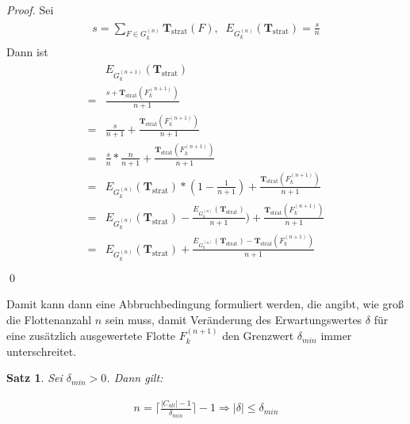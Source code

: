 \documentclass[a4paper,12pt]{llncs}
\numberwithin{equation}{section}
\newtheorem{satz}{Satz}
\DeclareMathOperator{\strat}{strat}
\begin{document}
\begin{proof}
Sei
\begin{align}
\begin{split}
s=\sum_{F \in G_k^{(n)}} \mathbf{T}_{\strat}(F),\;\; E_{G_k^{(n)}}(\mathbf{T}_{\strat}) =\frac{s}{n}
\end{split}
\end{align}
Dann ist
\begin{align}
\begin{split}
&E_{G_k^{(n+1)}}(\mathbf{T}_{\strat})\\
=&\frac{s+ \mathbf{T}_{\strat}(F_k^{(n+1)}) }{n + 1}\\
=&\frac{s}{n + 1} + \frac{\mathbf{T}_{\strat}(F_k^{(n+1)}) }{n + 1}\\
=&\frac{s}{n} * \frac{n}{n + 1} + \frac{\mathbf{T}_{\strat}(F_k^{(n+1)}) }{n + 1}\\
=&E_{G_k^{(n)}}(\mathbf{T}_{\strat}) * (1 - \frac{1}{n + 1}) + \frac{\mathbf{T}_{\strat}(F_k^{(n+1)}) }{n + 1}\\
=&E_{G_k^{(n)}}(\mathbf{T}_{\strat}) - \frac{E_{G_k^{(n)}}(\mathbf{T}_{\strat})}{n + 1}) + \frac{\mathbf{T}_{\strat}(F_k^{(n+1)}) }{n + 1}\\
=&E_{G_k^{(n)}}(\mathbf{T}_{\strat}) + \frac{E_{G_k^{(n)}}(\mathbf{T}_{\strat}) - \mathbf{T}_{\strat}(F_k^{(n+1)}) }{n + 1}\\
\end{split}
\end{align}
\qed
\end{proof}

Damit kann dann eine Abbruchbedingung formuliert werden, die angibt, wie groß die Flottenanzahl $n$ sein muss, damit Veränderung des Erwartungswertes $\delta$ für eine zusätzlich ausgewertete Flotte $F_k^{(n+1)}$ den Grenzwert $\delta_{min}$ immer unterschreitet.



\begin{satz}
Sei $\delta_{min} > 0$.
Dann gilt:

\begin{align}
n = \lceil \frac{|C_{all}| - 1}{\delta_{min}} \rceil - 1 \Rightarrow |\delta| \leq \delta_{min}
\nonumber
\end{align}
\end{satz}
\end{document}
